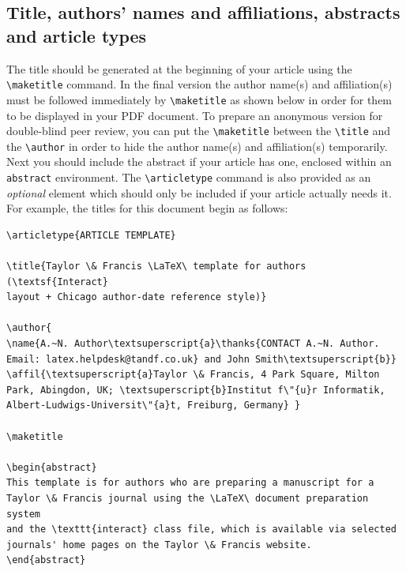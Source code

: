 \documentclass[]{interact}
\theoremstyle{plain}%
\theoremstyle{definition}
\theoremstyle{remark}
\begin{document}
\subsection{Title, authors' names and affiliations, abstracts and article types}

The title should be generated at the beginning of your article using the \verb"\maketitle" command.
In the final version the author name(s) and affiliation(s) must be followed immediately by \verb"\maketitle" as shown below in order for them to be displayed in your PDF document.
To prepare an anonymous version for double-blind peer review, you can put the \verb"\maketitle" between the \verb"\title" and the \verb"\author" in order to hide the author name(s) and affiliation(s) temporarily.
Next you should include the abstract if your article has one, enclosed within an \texttt{abstract} environment.
The \verb"\articletype" command is also provided as an \emph{optional} element which should only be included if your article actually needs it.
For example, the titles for this document begin as follows:
\begin{verbatim}
\articletype{ARTICLE TEMPLATE}

\title{Taylor \& Francis \LaTeX\ template for authors (\textsf{Interact}
layout + Chicago author-date reference style)}

\author{
\name{A.~N. Author\textsuperscript{a}\thanks{CONTACT A.~N. Author.
Email: latex.helpdesk@tandf.co.uk} and John Smith\textsuperscript{b}}
\affil{\textsuperscript{a}Taylor \& Francis, 4 Park Square, Milton
Park, Abingdon, UK; \textsuperscript{b}Institut f\"{u}r Informatik,
Albert-Ludwigs-Universit\"{a}t, Freiburg, Germany} }

\maketitle

\begin{abstract}
This template is for authors who are preparing a manuscript for a
Taylor \& Francis journal using the \LaTeX\ document preparation system
and the \texttt{interact} class file, which is available via selected
journals' home pages on the Taylor \& Francis website.
\end{abstract}
\end{verbatim}
\end{document}
